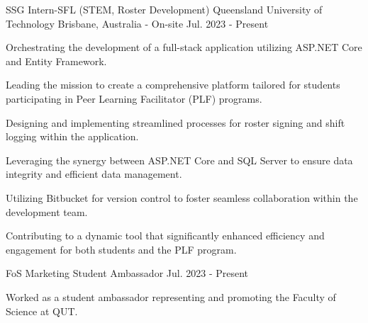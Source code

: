 \begin{cventries}
    
  \cventry
    {SSG Intern-SFL (STEM, Roster Development)} %
    {Queensland University of Technology} %
    {Brisbane, Australia - On-site} %
    {Jul. 2023 - Present} %
    {
      \begin{cvitems} %
        \item {Orchestrating the development of a full-stack application utilizing ASP.NET Core and Entity Framework.}
        \item {Leading the mission to create a comprehensive platform tailored for students participating in Peer Learning Facilitator (PLF) programs.}
        \item {Designing and implementing streamlined processes for roster signing and shift logging within the application.}
        \item {Leveraging the synergy between ASP.NET Core and SQL Server to ensure data integrity and efficient data management.}
        \item {Utilizing Bitbucket for version control to foster seamless collaboration within the development team.}
        \item {Contributing to a dynamic tool that significantly enhanced efficiency and engagement for both students and the PLF program.}
      \end{cvitems}
    }
    
  \cventry
    {FoS Marketing Student Ambassador} %
    {} %
    {} %
    {Jul. 2023 - Present} %
    {
      \begin{cvitems} %
        \item {Worked as a student ambassador representing and promoting the Faculty of Science at QUT.}
      \end{cvitems}
    }
    

\end{cventries}

